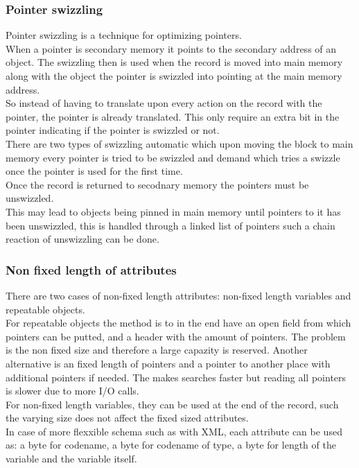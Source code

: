 \documentclass[12pt, a4paper]{article}
\begin{document}
			\subsubsection{Pointer swizzling}
				Pointer swizzling is a technique for optimizing pointers.\\
				When a pointer is secondary memory it points to the secondary address of an object. The swizzling then is used when the record is moved into main memory along with the object the pointer is swizzled into pointing at the main memory address.\\
				So instead of having to translate upon every action on the record with the pointer, the pointer is already translated. This only require an extra bit in the pointer indicating if the pointer is swizzled or not.\\
				There are two types of swizzling automatic which upon moving the block to main memory every pointer is tried to be swizzled and demand which tries a swizzle once the pointer is used for the first time.\\
				Once the record is returned to secodnary memory the pointers must be unswizzled.\\
				This may lead to objects being pinned in main memory until pointers to it has been unswizzled, this is handled through a linked list of pointers such a chain reaction of unswizzling can be done.
			\subsubsection{Non fixed length of attributes}
				There are two cases of non-fixed length attributes: non-fixed length variables and repeatable objects.\\
				For repeatable objects the method is to in the end have an open field from which pointers can be putted, and a header with the amount of pointers. The problem is the non fixed size and therefore a large capazity is reserved. Another alternative is an fixed length of pointers and a pointer to another place with additional pointers if needed. The makes searches faster but reading all pointers is slower due to more I/O calls.\\
				For non-fixed length variables, they can be used at the end of the record, such the varying size does not affect the fixed sized attributes.\\
				In case of more flexxible schema such as with XML, each attribute can be used as: a byte for codename, a byte for codename of type, a byte for length of the variable and the variable itself.\\
\end{document}
